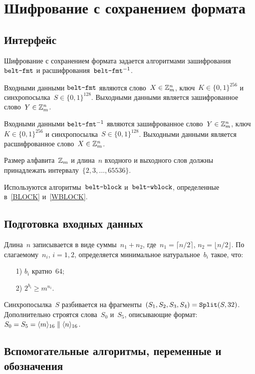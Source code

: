 \section{Шифрование с сохранением формата}\label{FMT}

\subsection{Интерфейс}\label{FMT.IFace}

Шифрование с сохранением формата задается алгоритмами зашифрования
$\texttt{belt-fmt}$ и расшифрования~$\texttt{belt-fmt}^{-1}$.

Входными данными $\texttt{belt-fmt}$ являются 
слово~$X\in\mathbb{Z}_m^n$, ключ~$K\in\{0,1\}^{256}$ 
и синхропосылка~$S\in\{0,1\}^{128}$.
%
Выходными данными является зашифрованное слово~$Y\in\mathbb{Z}_m^n$.

Входными данными $\texttt{belt-fmt}^{-1}$ являются 
зашифрованное слово~$Y\in\mathbb{Z}_m^n$, ключ~$K\in\{0,1\}^{256}$ 
и синхропосылка~$S\in\{0,1\}^{128}$.
%
Выходными данными является расшифрованное слово~$X\in\mathbb{Z}_m^n$.

Размер алфавита~$\mathbb{Z}_m$ и длина~$n$ входного и выходного слов 
должны принадлежать интервалу~$\{2,3,\ldots,65536\}$.

Используются алгоритмы~$\texttt{belt-block}$ и~$\texttt{belt-wblock}$,
определенные в~\ref{BLOCK} и~\ref{WBLOCK}.

\subsection{Подготовка входных данных}\label{FMT.Data}

Длина~$n$ записывается в виде суммы~$n_1+n_2$,
где~$n_1=\lceil n/2\rceil$, $n_2=\lfloor n/2\rfloor$.
%
По слагаемому~$n_i$, $i=1,2$, определяется минимальное натуральное~$b_i$ 
такое, что:
\begin{enumerate}
\item[1)]
$b_i$ кратно~$64$;
\item[2)]
$2^{b_i}\geq m^{n_i}$.
\end{enumerate}

Синхропосылка~$S$ разбивается на фрагменты~$(S_1,S_2,S_3,S_4)=\mathop{\texttt{Split}}\nolimits(S,32)$. 
%
Дополнительно строятся слова~$S_0$ и~$S_5$, описывающие формат: 
$S_0=S_5=\langle m\rangle_{16}\parallel\langle n\rangle_{16}$. 

\subsection{Вспомогательные алгоритмы, переменные и обозначения}\label{FMT.Aux}

